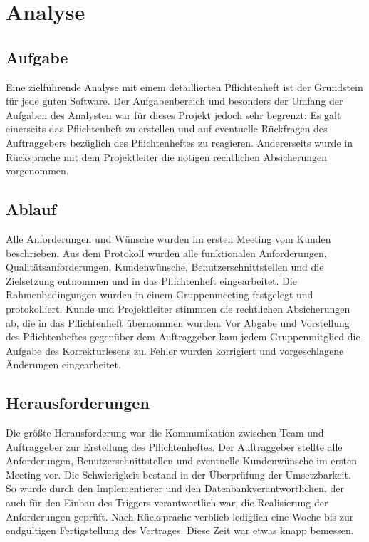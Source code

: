 \documentclass{scrartcl}
\date{}
\begin{document}
\maketitle
\tableofcontents
\renewcommand{\maketitle}{}
\renewcommand{\tableofcontents}{}

\section{Analyse}
\subsection{Aufgabe}
Eine zielführende Analyse mit einem detaillierten Pflichtenheft ist der Grundstein für jede guten Software. Der Aufgabenbereich und besonders der Umfang der Aufgaben des Analysten war für dieses Projekt jedoch sehr begrenzt: Es galt einerseits das Pflichtenheft zu erstellen und auf eventuelle Rückfragen des Auftraggebers bezüglich des Pflichtenheftes zu reagieren. Andererseits wurde in Rücksprache mit dem Projektleiter die nötigen rechtlichen Absicherungen vorgenommen.

\subsection{Ablauf}
Alle Anforderungen und Wünsche wurden im ersten Meeting vom Kunden beschrieben. Aus dem Protokoll wurden alle funktionalen Anforderungen, Qualitätsanforderungen, Kundenwünsche, Benutzerschnittstellen und die Zielsetzung entnommen und in das Pflichtenheft eingearbeitet. Die Rahmenbedingungen wurden in einem Gruppenmeeting festgelegt und protokolliert. Kunde und Projektleiter stimmten die rechtlichen Absicherungen ab, die in das Pflichtenheft übernommen wurden. Vor Abgabe und Vorstellung des Pflichtenheftes gegenüber dem Auftraggeber kam jedem Gruppenmitglied die Aufgabe des Korrekturlesens zu. Fehler wurden korrigiert und vorgeschlagene Änderungen eingearbeitet.

\subsection{Herausforderungen}
Die größte Herausforderung war die Kommunikation zwischen Team und Auftraggeber zur Erstellung des Pflichtenheftes. Der Auftraggeber stellte alle Anforderungen, Benutzerschnittstellen und eventuelle Kundenwünsche im ersten Meeting vor. Die Schwierigkeit bestand in der Überprüfung der Umsetzbarkeit. So wurde durch den Implementierer und den Datenbankverantwortlichen, der auch für den Einbau des Triggers verantwortlich war, die Realisierung der Anforderungen geprüft. Nach Rücksprache verblieb lediglich eine Woche bis zur endgültigen Fertigstellung des Vertrages. Diese Zeit war etwas knapp bemessen. 
\end{document}
